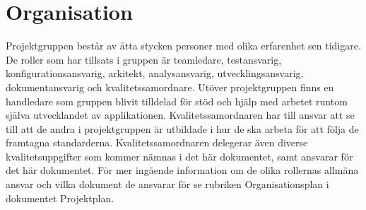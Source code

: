 \section{Organisation}
Projektgruppen består av åtta stycken personer med olika erfarenhet sen tidigare. De roller som har tillsats i gruppen är teamledare, testansvarig, konfigurationsansvarig, arkitekt, analysansvarig, utvecklingsansvarig, dokumentansvarig och kvalitetssamordnare. Utöver projektgruppen finns en handledare som gruppen blivit tilldelad för stöd och hjälp med arbetet runtom själva utvecklandet av applikationen. Kvalitetssamordnaren har till ansvar att se till att de andra i projektgruppen är utbildade i hur de ska arbeta för att följa de framtagna standarderna. Kvalitetssamordnaren delegerar även diverse kvalitetsuppgifter som kommer nämnas i det här dokumentet, samt ansvarar för det här dokumentet. För mer ingående information om de olika rollernas allmäna ansvar och vilka dokument de ansvarar för se rubriken Organisationsplan i dokumentet Projektplan.
